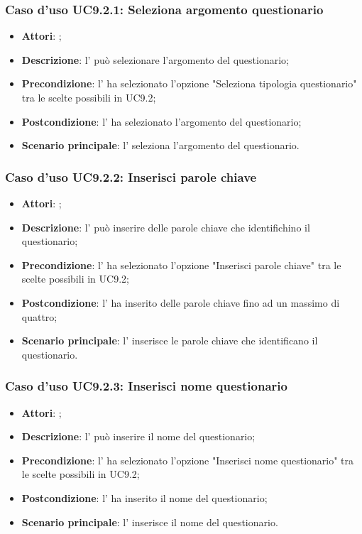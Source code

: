 		\subsubsection{Caso d'uso UC9.2.1: Seleziona argomento questionario}
		\label{UC9.2.1}
		\begin{itemize}
			\item \textbf{Attori}: \uaupro{};
			\item \textbf{Descrizione}: l'\uaupro{} può selezionare l'argomento del questionario; 
			\item \textbf{Precondizione}: l'\uaupro{} ha selezionato l'opzione "Seleziona tipologia questionario" tra le scelte possibili in UC9.2;
			\item \textbf{Postcondizione}: l'\uaupro{} ha selezionato l'argomento del questionario;
			\item \textbf{Scenario principale}: l'\uaupro{} seleziona l'argomento del questionario.
		\end{itemize}
		
		\subsubsection{Caso d'uso UC9.2.2: Inserisci parole chiave}
		\label{UC9.2.2}
		\begin{itemize}
			\item \textbf{Attori}: \uaupro{};
			\item \textbf{Descrizione}: l'\uaupro{} può inserire delle parole chiave che identifichino il questionario; 
			\item \textbf{Precondizione}: l'\uaupro{} ha selezionato l'opzione "Inserisci parole chiave" tra le scelte possibili in UC9.2;
			\item \textbf{Postcondizione}: l'\uaupro{} ha inserito delle parole chiave fino ad un massimo di quattro; 
			\item \textbf{Scenario principale}: l'\uaupro{} inserisce le parole chiave che identificano il questionario.
		\end{itemize}
			
		\subsubsection{Caso d'uso UC9.2.3: Inserisci nome questionario}
		\label{UC9.2.3}
		\begin{itemize}
			\item \textbf{Attori}: \uaupro{};
			\item \textbf{Descrizione}: l'\uaupro{} può inserire il nome del questionario; 
			\item \textbf{Precondizione}: l'\uaupro{} ha selezionato l'opzione "Inserisci nome questionario" tra le scelte possibili in UC9.2;
			\item \textbf{Postcondizione}: l'\uaupro{} ha inserito il nome del questionario; 
			\item \textbf{Scenario principale}: l'\uaupro{} inserisce il nome del questionario.
		\end{itemize}
				
